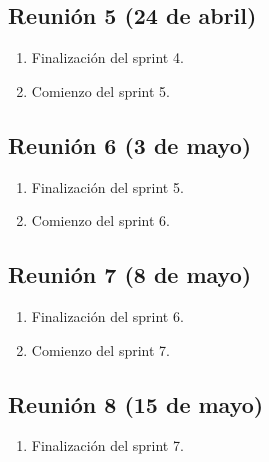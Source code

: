 \subsection{Reunión 5 (24 de abril)}
\begin{enumerate}
	\item Finalización del sprint 4.
	\item Comienzo del sprint 5.
\end{enumerate}

\subsection{Reunión 6 (3 de mayo)}
\begin{enumerate}
	\item Finalización del sprint 5.
	\item Comienzo del sprint 6.
\end{enumerate}

\subsection{Reunión 7 (8 de mayo)}
\begin{enumerate}
	\item Finalización del sprint 6.
	\item Comienzo del sprint 7.
\end{enumerate}

\subsection{Reunión 8 (15 de mayo)}
\begin{enumerate}
	\item Finalización del sprint 7.
\end{enumerate}
